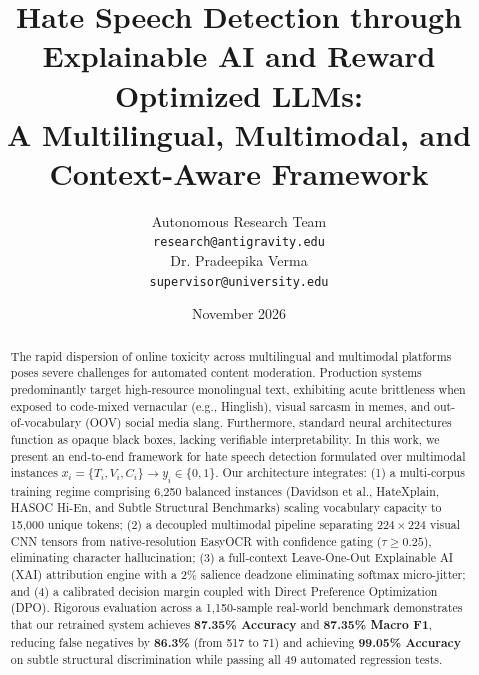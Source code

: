 \documentclass[11pt]{article}
\title{Hate Speech Detection through Explainable AI and Reward Optimized LLMs: \\ A Multilingual, Multimodal, and Context-Aware Framework}
\author{
  Autonomous Research Team \\
  \texttt{research@antigravity.edu} \\
  \And
  Dr. Pradeepika Verma \\
  \texttt{supervisor@university.edu}
}
\date{November 2026}
\begin{document}
\maketitle

\begin{abstract}
The rapid dispersion of online toxicity across multilingual and multimodal platforms poses severe challenges for automated content moderation. Production systems predominantly target high-resource monolingual text, exhibiting acute brittleness when exposed to code-mixed vernacular (e.g., Hinglish), visual sarcasm in memes, and out-of-vocabulary (OOV) social media slang. Furthermore, standard neural architectures function as opaque black boxes, lacking verifiable interpretability. In this work, we present an end-to-end framework for hate speech detection formulated over multimodal instances $x_i = \{T_i, V_i, C_i\} \to y_i \in \{0, 1\}$. Our architecture integrates: (1) a multi-corpus training regime comprising 6,250 balanced instances (Davidson et al., HateXplain, HASOC Hi-En, and Subtle Structural Benchmarks) scaling vocabulary capacity to 15,000 unique tokens; (2) a decoupled multimodal pipeline separating $224 \times 224$ visual CNN tensors from native-resolution EasyOCR with confidence gating ($\tau \ge 0.25$), eliminating character hallucination; (3) a full-context Leave-One-Out Explainable AI (XAI) attribution engine with a 2\% salience deadzone eliminating softmax micro-jitter; and (4) a calibrated decision margin coupled with Direct Preference Optimization (DPO). Rigorous evaluation across a 1,150-sample real-world benchmark demonstrates that our retrained system achieves \textbf{87.35\% Accuracy} and \textbf{87.35\% Macro F1}, reducing false negatives by \textbf{86.3\%} (from 517 to 71) and achieving \textbf{99.05\% Accuracy} on subtle structural discrimination while passing all 49 automated regression tests.
\end{abstract}
\end{document}
